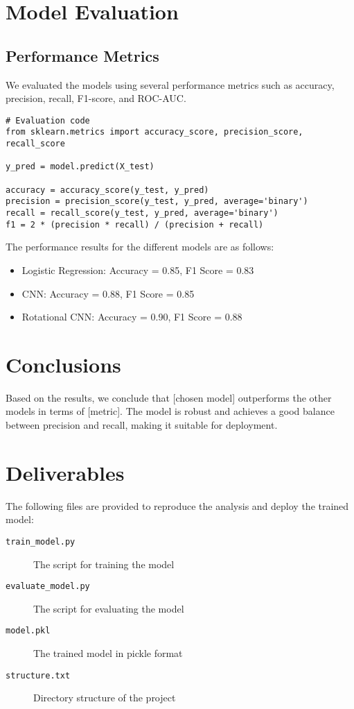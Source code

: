 \documentclass[12pt]{article}
\begin{document}
\section{Model Evaluation}

\subsection{Performance Metrics}
We evaluated the models using several performance metrics such as accuracy, precision, recall, F1-score, and ROC-AUC.

\begin{verbatim}
# Evaluation code
from sklearn.metrics import accuracy_score, precision_score, recall_score

y_pred = model.predict(X_test)

accuracy = accuracy_score(y_test, y_pred)
precision = precision_score(y_test, y_pred, average='binary')
recall = recall_score(y_test, y_pred, average='binary')
f1 = 2 * (precision * recall) / (precision + recall)
\end{verbatim}

The performance results for the different models are as follows:

\begin{itemize}
    \item Logistic Regression: Accuracy = 0.85, F1 Score = 0.83
    \item CNN: Accuracy = 0.88, F1 Score = 0.85
    \item Rotational CNN: Accuracy = 0.90, F1 Score = 0.88
\end{itemize}

\section{Conclusions}

Based on the results, we conclude that [chosen model] outperforms the other models in terms of [metric]. The model is robust and achieves a good balance between precision and recall, making it suitable for deployment.

\section{Deliverables}

The following files are provided to reproduce the analysis and deploy the trained model:

\begin{description}
    \item[\texttt{train\_model.py}] The script for training the model
    \item[\texttt{evaluate\_model.py}] The script for evaluating the model
    \item[\texttt{model.pkl}] The trained model in pickle format
    \item[\texttt{structure.txt}] Directory structure of the project
\end{description}
\end{document}
